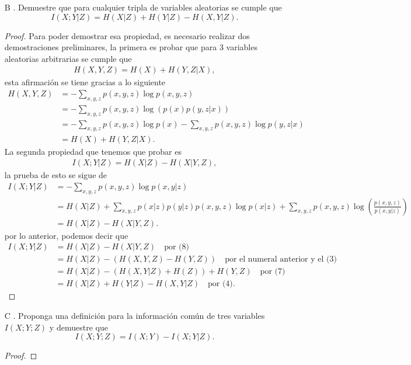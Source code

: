 \begin{enumerate}
\begin{proof}
\end{proof}

    \item[B]. Demuestre que para cualquier tripla de variables aleatorias se cumple que 
    \[
    I(X; Y | Z) = H(X | Z) + H(Y | Z) - H(X, Y | Z).
    \]
    \begin{proof}
    Para poder demostrar esa propiedad, es necesario realizar dos demostraciones preliminares, la primera es probar que para 3 variables aleatorias arbitrarias se cumple que
    \begin{align}
        H(X,Y,Z)=H(X)+H(Y,Z|X)
    ,\end{align}
    esta afirmación se tiene gracias a lo siguiente 
    \begin{align*}
        H(X,Y,Z) &= - \sum_{x,y,z} p(x,y,z) \log p(x,y,z)\\
&= - \sum_{x,y,z} p(x,y,z) \log \left( p(x) p(y,z|x) \right)\\
&= - \sum_{x,y,z} p(x,y,z) \log p(x) - \sum_{x,y,z} p(x,y,z) \log p(y,z|x)\\
&= H(X) + H(Y,Z|X)
    .\end{align*}
La segunda propiedad que tenemos que probar es 
\begin{align}
    I(X;Y |Z) = H(X|Z)−H(X|Y,Z)
,\end{align}
la prueba de esto se sigue de
\begin{align*}
    I(X;Y | Z) &= - \sum_{x,y,z} p(x,y,z) \log p(x,y|z)\\
&= H(X|Z) + \sum_{x,y,z} p(x|z) p(y|z) p(x,y,z) \log p(x|z) + \sum_{x,y,z} p(x,y,z) \log \left( \frac{p(x,y,z)}{p(x,y|z)} \right)\\
&= H(X|Z) - H(X|Y,Z)
.\end{align*}
por lo anterior, podemos decir que 
    \begin{align*}
        I(X;Y | Z) &= H(X | Z) - H(X | Y, Z)\quad \text{por (8)}\\
&= H(X | Z) - \left( H(X, Y, Z) - H(Y, Z) \right) \quad \text{por el numeral anterior y el (3)}\\
&= H(X | Z) - \left( H(X, Y | Z) + H(Z) \right) + H(Y, Z) \quad \text{por (7)}\\
&= H(X | Z) + H(Y | Z) - H(X, Y | Z) \quad \text{por (4)}
    .\end{align*}
\end{proof}

    \item[C]. Proponga una definición para la información común de tres variables $I(X; Y; Z)$ y demuestre que 
    \[
    I(X; Y; Z) = I(X; Y) - I(X; Y | Z).
    \]
    \begin{proof}

\end{proof}

\end{enumerate}
